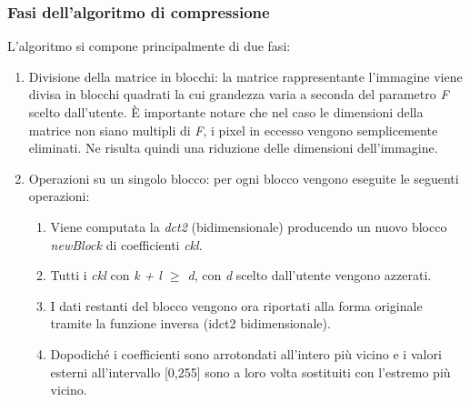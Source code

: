 \subsubsection{Fasi dell'algoritmo di compressione}
L'algoritmo si compone principalmente di due fasi:
\begin{enumerate}
	\item Divisione della matrice in blocchi: la matrice rappresentante l'immagine viene divisa in blocchi quadrati la cui grandezza varia a seconda del parametro \emph{F} scelto dall'utente. È importante notare che nel caso le dimensioni della matrice non siano multipli di \emph{F}, i pixel in eccesso vengono semplicemente eliminati. Ne risulta quindi una riduzione delle dimensioni dell'immagine.
	\item Operazioni su un singolo blocco: per ogni blocco vengono eseguite le seguenti operazioni:
	\begin{enumerate}
        \item Viene computata la \emph{dct2} (bidimensionale) producendo un nuovo blocco \emph{newBlock} di coefficienti \emph{ckl}.
        \item Tutti i \emph{ckl} con \emph{k + l $\geq$ d}, con \emph{d} scelto dall'utente vengono azzerati.
        \item I dati restanti del blocco vengono ora riportati alla forma originale tramite la funzione inversa (idct2 bidimensionale). %
        \item Dopodiché i coefficienti sono arrotondati all'intero più vicino e i valori esterni all'intervallo [0,255] sono a loro volta sostituiti con l'estremo più vicino.
    \end{enumerate}
\end{enumerate}